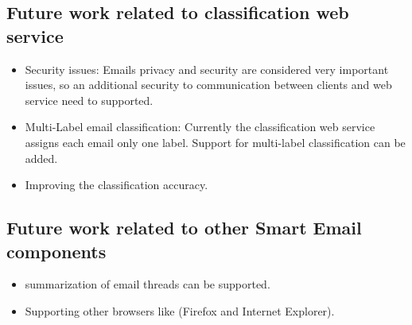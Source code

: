 \subsection{Future work related to classification web service}
\begin{itemize}
    \item Security issues: Emails privacy and security are considered very
    important issues, so an additional security to communication between clients and
    web service need to supported.
    \item Multi-Label email classification: Currently the classification web
    service assigns each email only one label. Support for multi-label
    classification can be added.
    \item Improving the classification accuracy.
\end{itemize}

\subsection{Future work related to other Smart Email components}
\begin{itemize}
    \item summarization of email threads can be supported.
    \item Supporting other browsers like (Firefox and Internet Explorer).
\end{itemize}


